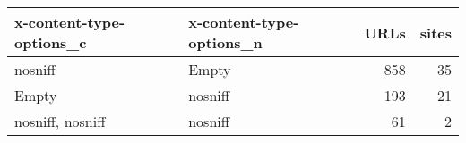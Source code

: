 \begin{tabular}{llrr}
\toprule
x-content-type-options\_c & x-content-type-options\_n &  URLs &  sites \\
\midrule
                 nosniff &                    Empty &   858 &     35 \\
                   Empty &                  nosniff &   193 &     21 \\
        nosniff, nosniff &                  nosniff &    61 &      2 \\
\bottomrule
\end{tabular}
